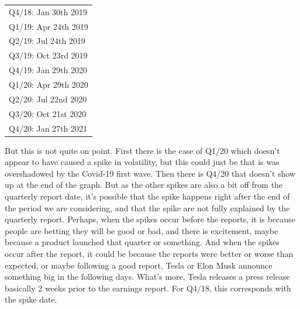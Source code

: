\begin{center}
\begin{tabular}{l}
Q4/18: Jan 30th 2019 \\
Q1/19: Apr 24th 2019 \\
Q2/19: Jul 24th 2019 \\%
Q3/19: Oct 23rd 2019 \\
Q4/19: Jan 29th 2020 \\
Q1/20: Apr 29th 2020 \\
Q2/20: Jul 22nd 2020 \\
Q3/20: Oct 21st 2020 \\
Q4/20: Jan 27th 2021
\end{tabular}
\end{center}


But this is not quite on point. First there is the case of Q1/20 which doesn't appear to have caused a spike in volatility, but this could just be that is was overshadowed by the Covid-19 first wave. Then there is Q4/20 that doesn't show up at the end of the graph. But as the other spikes are also a bit off from the quarterly report date, it's possible that the spike happens right after the end of the period we are considering, and that the spike are not fully explained by the quarterly report. Perhaps, when the spikes occur before the reports, it is because people are betting they will be good or bad, and there is excitement, maybe because a product launched that quarter or something. And when the spikes occur after the report, it could be because the reports were better or worse than expected, or maybe following a good report, Tesla or Elon Musk announce something big in the following days.
What's more, Tesla releases a press release basically 2 weeks prior to the earnings report. For Q4/18, this corresponds with the spike date.

